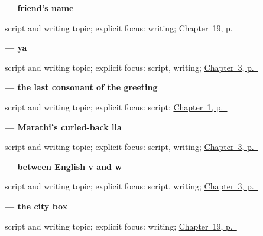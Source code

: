 \noindent\begin{minipage}[t]{\linewidth}
\raggedright
\textbf{  — friend's name}\par
\footnotesize script and writing topic; explicit focus: writing; \hyperref[ch:mr-a1-form-labels]{Chapter~19, p.~\pageref*{ch:mr-a1-form-labels}}
\end{minipage}\par\smallskip

\noindent\begin{minipage}[t]{\linewidth}
\raggedright
\textbf{ — ya}\par
\footnotesize script and writing topic; explicit focus: script, writing; \hyperref[ch:thanks-script-b]{Chapter~3, p.~\pageref*{ch:thanks-script-b}}
\end{minipage}\par\smallskip

\noindent\begin{minipage}[t]{\linewidth}
\raggedright
\textbf{ — the last consonant of the greeting}\par
\footnotesize script and writing topic; explicit focus: script; \hyperref[ch:first-greeting-script]{Chapter~1, p.~\pageref*{ch:first-greeting-script}}
\end{minipage}\par\smallskip

\noindent\begin{minipage}[t]{\linewidth}
\raggedright
\textbf{ — Marathi's curled-back lla}\par
\footnotesize script and writing topic; explicit focus: script, writing; \hyperref[ch:thanks-script-b]{Chapter~3, p.~\pageref*{ch:thanks-script-b}}
\end{minipage}\par\smallskip

\noindent\begin{minipage}[t]{\linewidth}
\raggedright
\textbf{ — between English v and w}\par
\footnotesize script and writing topic; explicit focus: script, writing; \hyperref[ch:thanks-script-b]{Chapter~3, p.~\pageref*{ch:thanks-script-b}}
\end{minipage}\par\smallskip

\noindent\begin{minipage}[t]{\linewidth}
\raggedright
\textbf{ — the city box}\par
\footnotesize script and writing topic; explicit focus: writing; \hyperref[ch:mr-a1-form-labels]{Chapter~19, p.~\pageref*{ch:mr-a1-form-labels}}
\end{minipage}\par\smallskip

